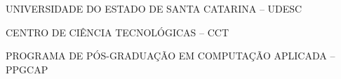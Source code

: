 
\renewcommand{\imprimircapa}{%
	\begin{capa}%
		\center

		{\fontseries{b}\selectfont\MakeTextUppercase{UNIVERSIDADE DO ESTADO DE SANTA CATARINA -- UDESC}}
		
		{\fontseries{b}\selectfont\MakeTextUppercase{CENTRO DE CIÊNCIA TECNOLÓGICAS -- CCT  }}
		
		{\fontseries{b}\selectfont\MakeTextUppercase{PROGRAMA DE PÓS-GRADUAÇÃO EM COMPUTAÇÃO APLICADA -- PPGCAP  }}
		
		\vfill
		
		{\fontseries{b}\selectfont\MakeTextUppercase{\normalsize\imprimirautor}}
		
		\vfill
		\begin{center}
			{\fontseries{b}\selectfont\MakeTextUppercase{\imprimirtitulo}}
		\end{center}
		\vfill
		
		\vfill
		
		{\fontseries{b}\selectfont\MakeTextUppercase{\imprimirlocal}}
		\par
		{\selectfont \imprimirdata}
		\vspace*{1cm}
	\end{capa}
}

\imprimircapa				%